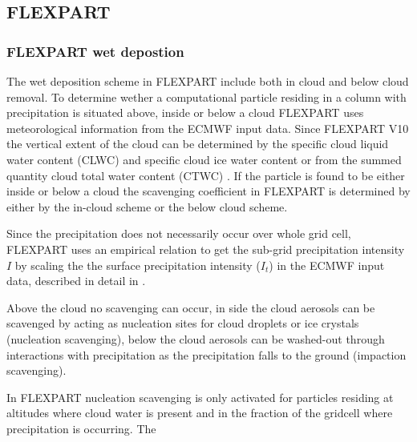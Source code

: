 
\subsection{FLEXPART}

\subsubsection{FLEXPART wet depostion}

The wet deposition scheme in FLEXPART include both in cloud and below cloud
removal. To determine wether a computational particle residing in a column with
precipitation is situated above, inside or below a cloud FLEXPART uses
meteorological information from the ECMWF input data. Since FLEXPART V10 the
vertical extent of the cloud can be determined by the specific cloud liquid
water content (CLWC) and specific cloud ice water content or from the summed
quantity cloud total water content (CTWC) \parencite{flexpart_wetdep}. If the
particle is found to be either inside or below a cloud the scavenging
coefficient in FLEXPART is determined by either by the in-cloud scheme or the
below cloud scheme.  

Since the precipitation does not necessarily occur over whole grid cell, FLEXPART uses an empirical relation to get the sub-grid precipitation intensity $ I $ by scaling the  the surface precipitation intensity ($ I_t $) in the ECMWF input data, described in detail in \textcite{Flexpart-2005_ref_paper} .   

Above the cloud no scavenging can occur, in side the cloud aerosols can be
scavenged by acting as nucleation sites for cloud droplets or
ice crystals (nucleation scavenging), below the cloud aerosols can be washed-out
through interactions with precipitation as the precipitation falls to the ground
(impaction scavenging). 

In FLEXPART nucleation scavenging is only activated for particles residing at
altitudes where cloud water is present and in the fraction of the gridcell where
precipitation is occurring. The    

